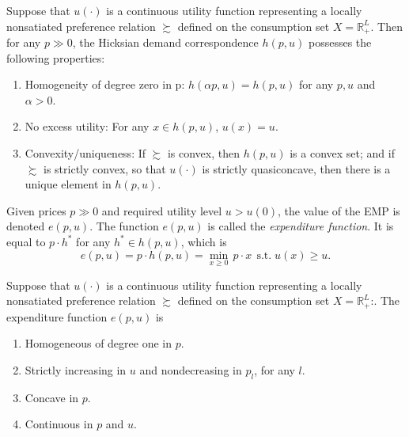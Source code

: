 \documentclass[12pt,fleqn]{book} %
\begin{document}
\begin{proposition}
	 Suppose that $u(\cdot)$ is a continuous utility function representing a
	locally nonsatiated preference relation $\succsim$ defined on the consumption set $X=\mathbb{R}_+^L$.
	Then for any $p \gg 0$, the Hicksian demand correspondence $h(p, u)$ possesses the
	following properties:
	\begin{enumerate}
		\item Homogeneity of degree zero in p: $h(\alpha p, u) = h(p, u)$ for any $p, u$ and $\alpha > 0$.
		\item No excess utility: For any $x \in h(p, u)$, $u(x) = u$.
		\item Convexity/uniqueness: If $\succsim$ is convex, then $h(p, u)$ is a convex set; and if $\succsim$ is strictly convex, so that $u(\cdot)$ is strictly quasiconcave, then there is
		a unique element in $h(p, u)$.
	\end{enumerate}
\end{proposition}

\begin{definition}
	Given prices $p \gg 0$ and required utility level $u > u(0)$, the value of the EMP is denoted
	$e(p, u)$. The function $e(p, u)$ is called the \emph{expenditure function}. It is equal to $p\cdot h^*$ for any $h^*\in h(p, u)$, which is
	\[
	e(p, u)=p\cdot h(p, u)=\min_{x\ge 0}\, p\cdot x\ \ \mathrm{s.t.}\; u(x)\ge u.
	\]
	
\end{definition}


\begin{proposition}
Suppose that $u(\cdot)$ is a continuous utility function representing a locally nonsatiated preference relation $\succsim$ defined on the consumption set $X=\mathbb{R}_+^L$:.
The expenditure function $e(p, u)$ is
\begin{enumerate}
	\item  Homogeneous of degree one in $p$.
    \item  Strictly increasing in $u$ and nondecreasing in $p_l$, for any $l$.
	\item  Concave in $p$.
	\item  Continuous in $p$ and $u$.
\end{enumerate}


\end{proposition}
\end{document}

